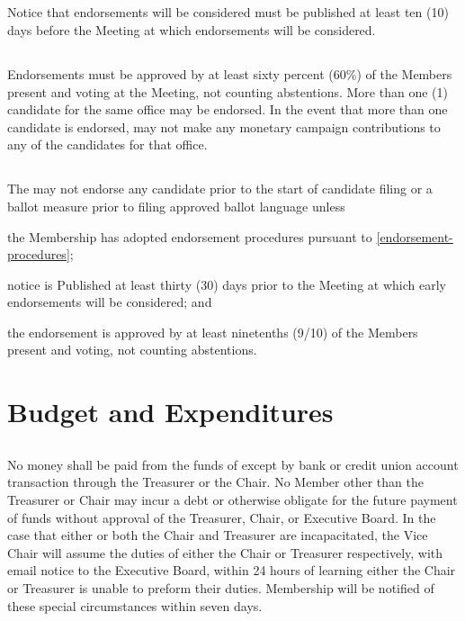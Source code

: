 \subsection{}
Notice that endorsements will be considered must be published at least ten (10) days before the Meeting at which endorsements will be considered.

\subsection{}
Endorsements must be approved by at least sixty percent (60\%) of the Members present and voting at the Meeting, not counting abstentions. More than one (1) candidate for the same office may be endorsed. In the event that more than one candidate is endorsed, \thedistrict{} may not make any monetary campaign contributions to any of the candidates for that office.

\subsection{}
The \district{} may not endorse any candidate prior to the start of candidate filing or a ballot measure prior to filing approved ballot language unless
\begin{inlinealphalist}
    \item the Membership has adopted endorsement procedures pursuant to \autoref{endorsement-procedures};
    \item notice is Published at least thirty (30) days prior to the Meeting at which early endorsements will be considered; and
    \item the endorsement is approved by at least ninetenths (9/10) of the Members present and voting, not counting abstentions.
\end{inlinealphalist}

\section{Budget and Expenditures}
\subsection{}
No money shall be paid from the funds of \thedistrict{} except by bank or credit union account transaction through the Treasurer or the Chair. No Member other than the Treasurer or Chair may incur a debt or otherwise obligate \thedistrict{} for the future payment of funds without approval of the Treasurer, Chair, or Executive Board. In the case that either or both the Chair and Treasurer are incapacitated, the Vice Chair will assume the duties of either the Chair or Treasurer respectively, with email notice to the Executive Board, within 24 hours of learning either the Chair or Treasurer is unable to preform their duties. Membership will be notified of these special circumstances within seven days.

